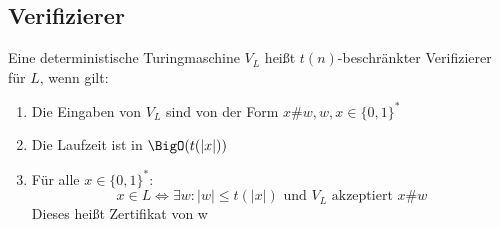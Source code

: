 \documentclass{article}
\begin{document}
\subsection{Verifizierer}
Eine deterministische Turingmaschine $V_L$ heißt $t(n)$-beschränkter Verifizierer für $L$, wenn gilt:
\begin{enumerate}
	\item Die Eingaben von $V_L$ sind von der Form $x\#w, w, x\in\{0,1\}^*$
	\item Die Laufzeit ist in $\BigO(t(|x|))$
	\item Für alle $x\in\{0,1\}^*$:
		$$
			x\in L\Leftrightarrow\exists w:|w|\leq t(|x|) \text{ und } V_L \text{ akzeptiert } x\#w
		$$
		Dieses heißt Zertifikat von w
\end{enumerate}
\end{document}
